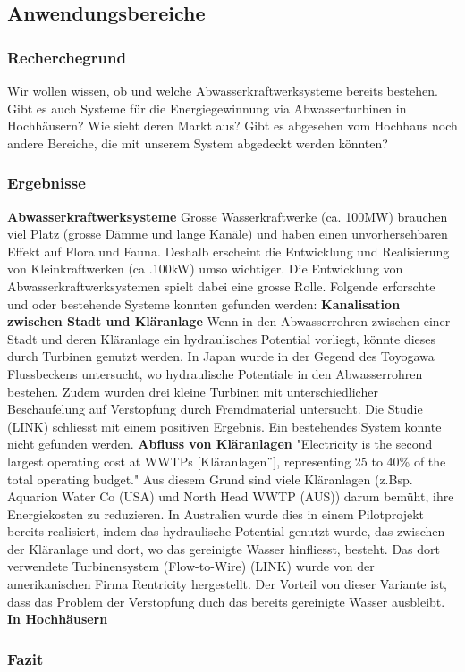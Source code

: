 \subsection{Anwendungsbereiche}
\subsubsection{Recherchegrund}
Wir wollen wissen, ob und welche Abwasserkraftwerksysteme bereits bestehen. Gibt es auch Systeme für die Energiegewinnung via Abwasserturbinen in Hochhäusern? Wie sieht deren Markt aus? Gibt es abgesehen vom Hochhaus noch andere Bereiche, die mit unserem System abgedeckt werden könnten?
\subsubsection{Ergebnisse}
\textbf{Abwasserkraftwerksysteme}
\newline
Grosse Wasserkraftwerke (ca. 100\si{MW}) brauchen viel Platz (grosse Dämme und lange Kanäle) und haben einen unvorhersehbaren Effekt auf Flora und Fauna. Deshalb erscheint die Entwicklung und Realisierung von Kleinkraftwerken (ca .100\si{kW}) umso wichtiger. Die Entwicklung von Abwasserkraftwerksystemen spielt dabei eine grosse Rolle. Folgende erforschte und oder bestehende Systeme konnten gefunden werden:
\newline
\newline
\textbf{Kanalisation zwischen Stadt und Kläranlage}
\newline
Wenn in den Abwasserrohren zwischen einer Stadt und deren Kläranlage ein hydraulisches Potential vorliegt, könnte dieses durch Turbinen genutzt werden. In Japan wurde in der Gegend des Toyogawa Flussbeckens untersucht, wo hydraulische Potentiale in den Abwasserrohren bestehen. Zudem wurden drei kleine Turbinen mit unterschiedlicher Beschaufelung auf Verstopfung durch Fremdmaterial untersucht. Die Studie (LINK) schliesst mit einem positiven Ergebnis. Ein bestehendes System konnte nicht gefunden werden.
\newline
\newline
\textbf{Abfluss von Kläranlagen}
\newline
"Electricity is the second largest operating cost at WWTPs [Kläranlagen¨], representing 25 to 40\% of the total operating budget."
Aus diesem Grund sind viele Kläranlagen (z.Bsp. Aquarion Water Co (USA) und North Head WWTP (AUS)) darum bemüht, ihre Energiekosten zu reduzieren. In Australien wurde dies in einem Pilotprojekt bereits realisiert, indem das hydraulische Potential genutzt wurde, das zwischen der Kläranlage und dort, wo das gereinigte Wasser hinfliesst, besteht. Das dort verwendete Turbinensystem (Flow-to-Wire) (LINK) wurde von der amerikanischen Firma Rentricity hergestellt. Der Vorteil von dieser Variante ist, dass das Problem der Verstopfung duch das bereits gereinigte Wasser ausbleibt. 
\newline
\newline
\textbf{In Hochhäusern}

\subsubsection{Fazit}
\clearpage 
